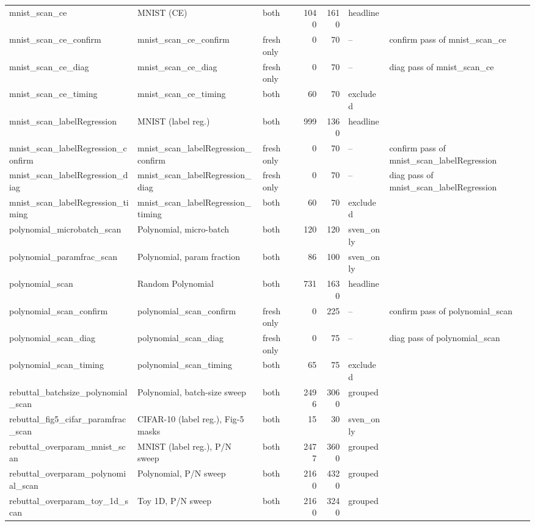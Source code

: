 \begin{tabular}{lllrrll}
mnist\_scan\_ce & MNIST (CE) & both & 1040 & 1610 & headline &  \\
mnist\_scan\_ce\_confirm & mnist\_scan\_ce\_confirm & fresh only & 0 & 70 & -- & confirm pass of mnist\_scan\_ce \\
mnist\_scan\_ce\_diag & mnist\_scan\_ce\_diag & fresh only & 0 & 70 & -- & diag pass of mnist\_scan\_ce \\
mnist\_scan\_ce\_timing & mnist\_scan\_ce\_timing & both & 60 & 70 & excluded &  \\
mnist\_scan\_labelRegression & MNIST (label reg.) & both & 999 & 1360 & headline &  \\
mnist\_scan\_labelRegression\_confirm & mnist\_scan\_labelRegression\_confirm & fresh only & 0 & 70 & -- & confirm pass of mnist\_scan\_labelRegression \\
mnist\_scan\_labelRegression\_diag & mnist\_scan\_labelRegression\_diag & fresh only & 0 & 70 & -- & diag pass of mnist\_scan\_labelRegression \\
mnist\_scan\_labelRegression\_timing & mnist\_scan\_labelRegression\_timing & both & 60 & 70 & excluded &  \\
polynomial\_microbatch\_scan & Polynomial, micro-batch & both & 120 & 120 & sven\_only &  \\
polynomial\_paramfrac\_scan & Polynomial, param fraction & both & 86 & 100 & sven\_only &  \\
polynomial\_scan & Random Polynomial & both & 731 & 1630 & headline &  \\
polynomial\_scan\_confirm & polynomial\_scan\_confirm & fresh only & 0 & 225 & -- & confirm pass of polynomial\_scan \\
polynomial\_scan\_diag & polynomial\_scan\_diag & fresh only & 0 & 75 & -- & diag pass of polynomial\_scan \\
polynomial\_scan\_timing & polynomial\_scan\_timing & both & 65 & 75 & excluded &  \\
rebuttal\_batchsize\_polynomial\_scan & Polynomial, batch-size sweep & both & 2496 & 3060 & grouped &  \\
rebuttal\_fig5\_cifar\_paramfrac\_scan & CIFAR-10 (label reg.), Fig-5 masks & both & 15 & 30 & sven\_only &  \\
rebuttal\_overparam\_mnist\_scan & MNIST (label reg.), P/N sweep & both & 2477 & 3600 & grouped &  \\
rebuttal\_overparam\_polynomial\_scan & Polynomial, P/N sweep & both & 2160 & 4320 & grouped &  \\
rebuttal\_overparam\_toy\_1d\_scan & Toy 1D, P/N sweep & both & 2160 & 3240 & grouped &  \\

\end{tabular}
